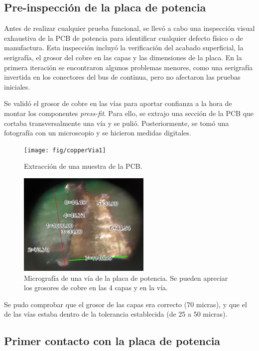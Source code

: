 \subsection{Pre-inspección de la placa de potencia}
Antes de realizar cualquier prueba funcional, se llevó a cabo una inspección visual exhaustiva de la PCB de potencia para identificar cualquier defecto físico o de manufactura. Esta inspección incluyó la verificación del acabado superficial, la serigrafía, el grosor del cobre en las capas y las dimensiones de la placa. En la primera iteración se encontraron algunos problemas menores, como una serigrafía invertida en los conectores del bus de continua, pero no afectaron las pruebas iniciales.

Se validó el grosor de cobre en las vías para aportar confianza a la hora de montar los componentes \textit{press-fit}. Para ello, se extrajo una sección de la PCB que cortaba transversalmente una vía y se pulió. Posteriormente, se tomó una fotografía con un microscopio y se hicieron medidas digitales.

\begin{figure}[H]
	\centering
	\texttt{[image: fig/copperVia1]}
	\caption{Extracción de una muestra de la PCB.}
\end{figure}


\begin{figure}[H]
	\centering
	\includegraphics[width=0.7\linewidth]{fig/copperVia}
	\caption{Micrografía de una vía de la placa de potencia. Se pueden apreciar los grosores de cobre en las 4 capas y en la vía.}
\end{figure}

Se pudo comprobar que el grosor de las capas era correcto (70 micras), y que el de las vías estaba dentro de la tolerancia establecida (de 25 a 50 micras).

\subsection{Primer contacto con la placa de potencia}

